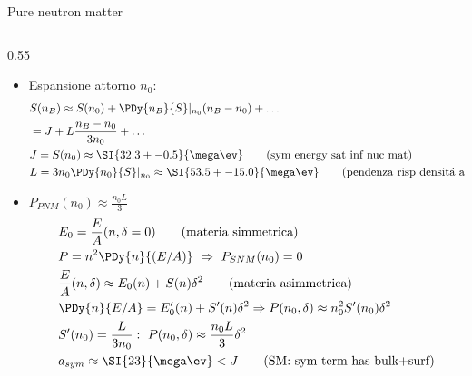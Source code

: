 \begin{frame}{Pure neutron matter}
\begin{columns}[T]
\begin{column}{0.55\textwidth}
\begin{itemize}
                \item Espansione attorno $n_0$:
                    \begin{align*}
                        &S(n_B)\approx S(n_0)+\PDy{n_B}{S}|_{n_0}(n_B-n_0)+\ldots\\
                        &=J+L \frac{n_B-n_0}{3n_0}+\ldots\\
                        &J=S(n_0)\approx\SI{32.3+-0.5}{\mega\ev}\tag{sym energy sat inf nuc mat}\\
                        &L=3n_0\PDy{n_0}{S}|_{n_0}\approx\SI{53.5+-15.0}{\mega\ev}\tag{pendenza risp densit\'a a $n_0$}
                    \end{align*}
                \item $P_{PNM}(n_0)\approx \frac{n_0L}{3}$
                    \begin{align*}
                        &E_0=\frac{E}{A}(n,\delta=0)\tag{materia simmetrica}\\
                        &P=n^2\PDy{n}{(E/A)}\ \Rightarrow\ P_{SNM}(n_0)=0\\
                        &\frac{E}{A}(n,\delta)\approx E_0(n)+S(n)\delta^2\tag{materia asimmetrica}\\
                        &\PDy{n}{E/A}=E_0'(n)+S'(n)\delta^2\Rightarrow P(n_0,\delta)\approx n_0^2S'(n_0)\delta^2\\
                        &S'(n_0)=\frac{L}{3n_0}:\ P(n_0,\delta)\approx \frac{n_0L}{3}\delta^2\\
                        &a_{sym}\approx\SI{23}{\mega\ev}<J\tag{SM: sym term has bulk+surf}
                    \end{align*}
            \end{itemize}
        \end{column}
    \end{columns}
\end{frame}

